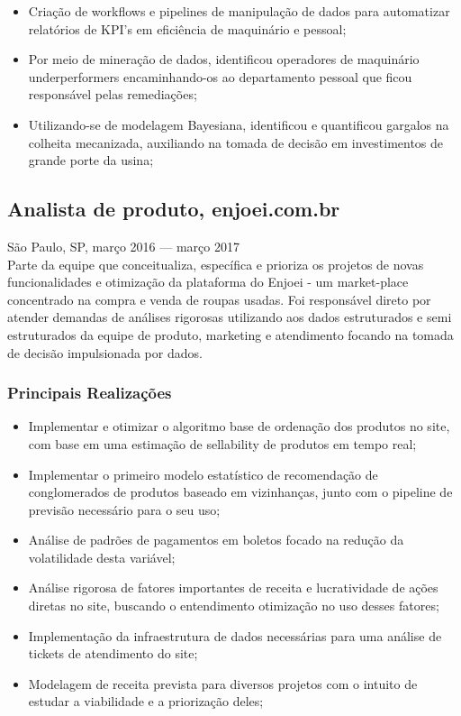 \documentclass{article}
\newcommand{\jobdate}[3]{
\large
\vspace{0.05em} 
  {#1, #2 --- #3}
\vspace{0.5em} 
\\
}
\begin{document}
\begin{itemize}

\item{Criação de workflows e pipelines de manipulação de dados para automatizar relatórios de KPI’s em eficiência de maquinário e pessoal;}
\item{Por meio de mineração de dados, identificou operadores de maquinário underperformers encaminhando-os ao departamento pessoal que ficou responsável pelas remediações;}
\item{Utilizando-se de modelagem Bayesiana, identificou e quantificou gargalos na colheita mecanizada, auxiliando na tomada de decisão em investimentos de grande porte da usina;}

\end{itemize}

\subsection{Analista de produto, enjoei.com.br}
\jobdate{São Paulo, SP}{março 2016}{março 2017}
Parte da equipe que conceitualiza, específica e prioriza os projetos de novas funcionalidades e otimização da plataforma do Enjoei - um market-place concentrado na compra e venda de roupas usadas. Foi responsável direto por atender demandas de análises rigorosas utilizando aos dados estruturados e semi estruturados da equipe de produto, marketing e atendimento focando na tomada de decisão impulsionada por dados.
\subsubsection{Principais Realizações}

\begin{itemize}

\item{Implementar e otimizar o algoritmo base de ordenação dos produtos no site, com base em uma estimação de sellability de produtos em tempo real;}
\item{Implementar o primeiro modelo estatístico de recomendação de conglomerados de produtos baseado em vizinhanças, junto com o pipeline de previsão necessário para o seu uso;}
\item{Análise de padrões de pagamentos em boletos focado na redução da volatilidade desta variável;}
\item{Análise rigorosa de fatores importantes de receita e lucratividade de ações diretas no site, buscando o entendimento otimização no uso desses fatores;}
\item{Implementação da infraestrutura de dados necessárias para uma análise de tickets de atendimento do site;}
\item{Modelagem de receita prevista para diversos projetos com o intuito de estudar a viabilidade e a priorização deles;}

\end{itemize}
\end{document}
